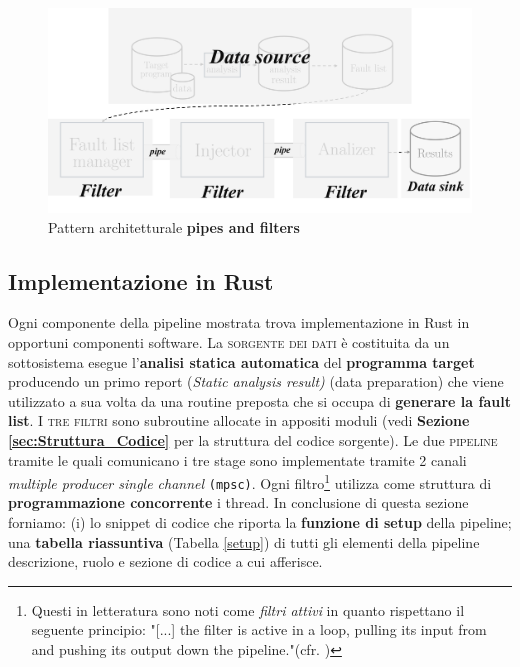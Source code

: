 \begin{figure}[h]
    \centering
    \includegraphics[scale=0.5]{img/pipeline_mapped.png}
    \caption{Pattern architetturale \textbf{pipes and filters}}
\end{figure}

\subsection{Implementazione in Rust}
Ogni componente della pipeline mostrata trova implementazione in Rust in opportuni componenti software. La \textsc{sorgente dei dati} è costituita da un sottosistema esegue l'\textbf{analisi statica automatica} del \textbf{programma target} producendo un primo report (\textit{Static analysis result)} (data preparation) che viene utilizzato a sua volta da una routine preposta che si occupa di \textbf{generare la fault list}. I \textsc{tre filtri} sono subroutine allocate in appositi moduli (vedi \textbf{Sezione \ref{sec:Struttura_Codice}} per la struttura del codice sorgente). Le due \textsc{pipeline} tramite le quali comunicano i tre stage sono implementate tramite 2 canali \textit{multiple producer single channel} \texttt{(mpsc)}. Ogni filtro\footnote{
    Questi in letteratura sono noti come \textit{filtri attivi} in quanto rispettano il seguente principio: "[...] the filter is active in a loop, pulling its input from
    and pushing its output down the pipeline."(cfr. \cite{schmidt2013pattern})
} utilizza come struttura di \textbf{programmazione concorrente} i thread.
In conclusione di questa sezione forniamo: (i) lo snippet di codice che riporta la \textbf{funzione di setup} della pipeline; una \textbf{tabella riassuntiva} (Tabella \ref{setup}) di tutti gli elementi della pipeline  descrizione, ruolo e sezione di codice a cui afferisce.\newpage

